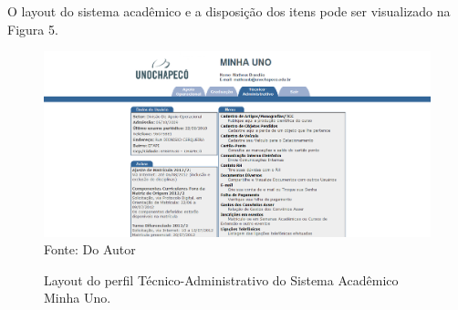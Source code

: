 O layout do sistema acadêmico e a disposição dos itens pode ser visualizado na Figura 5.


\begin{figure}[!htb]
     \centering
     \caption[Layout do Sistema - Perfil Técnico-Administrativo]{Layout do perfil Técnico-Administrativo do Sistema Acadêmico Minha Uno.}
     \includegraphics[scale=0.4]{imagens/tecnico.png}
     \\ Fonte: Do Autor
\end{figure}